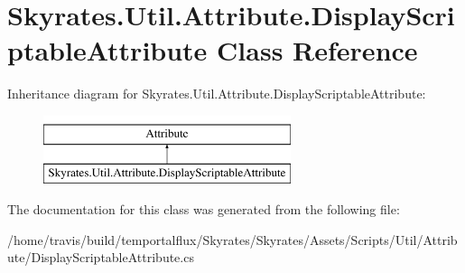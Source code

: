\hypertarget{class_skyrates_1_1_util_1_1_attribute_1_1_display_scriptable_attribute}{\section{Skyrates.\-Util.\-Attribute.\-Display\-Scriptable\-Attribute Class Reference}
\label{class_skyrates_1_1_util_1_1_attribute_1_1_display_scriptable_attribute}
}
Inheritance diagram for Skyrates.\-Util.\-Attribute.\-Display\-Scriptable\-Attribute\-:\begin{figure}[H]
\begin{center}
\leavevmode
\includegraphics[height=2.000000cm]{class_skyrates_1_1_util_1_1_attribute_1_1_display_scriptable_attribute}
\end{center}
\end{figure}


The documentation for this class was generated from the following file\-:\begin{DoxyCompactItemize}
\item 
/home/travis/build/temportalflux/\-Skyrates/\-Skyrates/\-Assets/\-Scripts/\-Util/\-Attribute/Display\-Scriptable\-Attribute.\-cs\end{DoxyCompactItemize}
